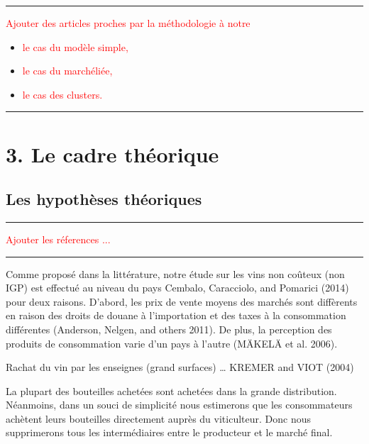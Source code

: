 \documentclass[11pt,]{article}
\providecommand{\tightlist}{%
  \setlength{\itemsep}{0pt}\setlength{\parskip}{0pt}}
\begin{document}
\noindent

\rule[0.5ex]{\linewidth}{1pt}

\textcolor{red}{Ajouter des articles proches par la méthodologie à notre }

\begin{itemize}
\tightlist
\item
  \textcolor{red}{le cas du modèle simple,  }
\item
  \textcolor{red}{le cas du marchéliée, }
\item
  \textcolor{red}{le cas des clusters.}
\end{itemize}

\noindent

\rule[0.5ex]{\linewidth}{1pt}

\hypertarget{le-cadre-theorique}{%
\section{3. Le cadre théorique}\label{le-cadre-theorique}}

\hypertarget{les-hypotheses-theoriques}{%
\subsection{Les hypothèses théoriques}\label{les-hypotheses-theoriques}}

\noindent

\rule[0.5ex]{\linewidth}{1pt}

\textcolor{red}{Ajouter les réferences ...}

\noindent

\rule[0.5ex]{\linewidth}{1pt}

Comme proposé dans la littérature, notre étude sur les vins non coûteux
(non IGP) est effectué au niveau du pays Cembalo, Caracciolo, and
Pomarici (2014) pour deux raisons. D'abord, les prix de vente moyens des
marchés sont diffèrents en raison des droits de douane à l'importation
et des taxes à la consommation différentes (Anderson, Nelgen, and others
2011). De plus, la perception des produits de consommation varie d'un
pays à l'autre (MÄKELÄ et al. 2006).

Rachat du vin par les enseignes (grand surfaces) \ldots{} KREMER and
VIOT (2004)

La plupart des bouteilles achetées sont achetées dans la grande
distribution. Néanmoins, dans un souci de simplicité nous estimerons que
les consommateurs achètent leurs bouteilles directement auprès du
viticulteur. Donc nous supprimerons tous les intermédiaires entre le
producteur et le marché final.
\end{document}
